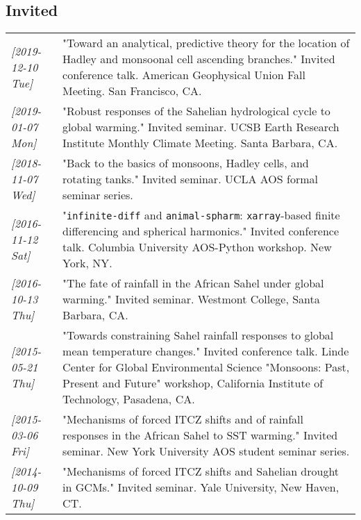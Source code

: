 \documentclass[12pt,letterpaper]{shillcv}
\begin{document}
\subsection*{Invited}
\label{sec:org96f2df3}
\begin{center}
\begin{tabularx}{\textwidth}{lX}
\textit{[2019-12-10 Tue]} & "Toward an analytical, predictive theory for the location of Hadley and monsoonal cell ascending branches."  Invited conference talk.  American Geophysical Union Fall Meeting.  San Francisco, CA.\\
\textit{[2019-01-07 Mon]} & "Robust responses of the Sahelian hydrological cycle to global warming."  Invited seminar.  UCSB Earth Research Institute Monthly Climate Meeting.  Santa Barbara, CA.\\
\textit{[2018-11-07 Wed]} & "Back to the basics of monsoons, Hadley cells, and rotating tanks."  Invited seminar.  UCLA AOS formal seminar series.\\
\textit{[2016-11-12 Sat]} & "\texttt{infinite-diff} and \texttt{animal-spharm}: \texttt{xarray}-based finite differencing and spherical harmonics."  Invited conference talk.  Columbia University AOS-Python workshop.  New York, NY.\\
\textit{[2016-10-13 Thu]} & "The fate of rainfall in the African Sahel under global warming."  Invited seminar.  Westmont College, Santa Barbara, CA.\\
\textit{[2015-05-21 Thu]} & "Towards constraining Sahel rainfall responses to global mean temperature changes."  Invited conference talk.  Linde Center for Global Environmental Science "Monsoons: Past, Present and Future" workshop, California Institute of Technology, Pasadena, CA.\\
\textit{[2015-03-06 Fri]} & "Mechanisms of forced ITCZ shifts and of rainfall responses in the African Sahel to SST warming."  Invited seminar.  New York University AOS student seminar series.\\
\textit{[2014-10-09 Thu]} & "Mechanisms of forced ITCZ shifts and Sahelian drought in GCMs."  Invited seminar.  Yale University, New Haven, CT.\\
\end{tabularx}
\end{center}
\end{document}
